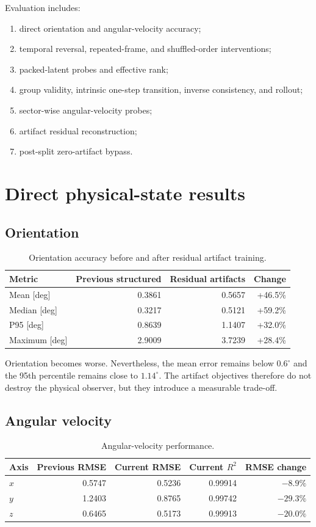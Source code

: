 \documentclass[11pt,a4paper]{article}
\begin{document}
Evaluation includes:
\begin{enumerate}
\item direct orientation and angular-velocity accuracy;
\item temporal reversal, repeated-frame, and shuffled-order interventions;
\item packed-latent probes and effective rank;
\item group validity, intrinsic one-step transition, inverse consistency, and rollout;
\item sector-wise angular-velocity probes;
\item artifact residual reconstruction;
\item post-split zero-artifact bypass.
\end{enumerate}

\section{Direct physical-state results}
\subsection{Orientation}
\begin{table}[htbp]\centering\caption{Orientation accuracy before and after residual artifact training.}\begin{tabular}{lrrr}\toprule
Metric & Previous structured & Residual artifacts & Change\\\midrule
Mean [deg] & 0.3861 & 0.5657 & +46.5\%\\
Median [deg] & 0.3217 & 0.5121 & +59.2\%\\
P95 [deg] & 0.8639 & 1.1407 & +32.0\%\\
Maximum [deg] & 2.9009 & 3.7239 & +28.4\%\\\bottomrule
\end{tabular}\end{table}
Orientation becomes worse. Nevertheless, the mean error remains below $0.6^\circ$ and the 95th percentile remains close to $1.14^\circ$. The artifact objectives therefore do not destroy the physical observer, but they introduce a measurable trade-off.

\subsection{Angular velocity}
\begin{table}[htbp]\centering\caption{Angular-velocity performance.}\begin{tabular}{lrrrr}\toprule
Axis & Previous RMSE & Current RMSE & Current $R^2$ & RMSE change\\\midrule
$x$ & 0.5747 & 0.5236 & 0.99914 & $-8.9\%$\\
$y$ & 1.2403 & 0.8765 & 0.99742 & $-29.3\%$\\
$z$ & 0.6465 & 0.5173 & 0.99913 & $-20.0\%$\\\bottomrule
\end{tabular}\end{table}
\end{document}
